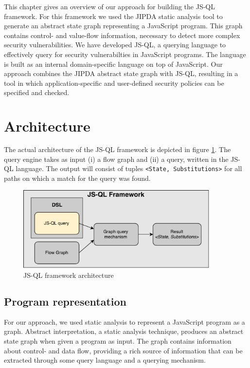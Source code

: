This chapter gives an overview of our approach for building the JS-QL framework. For this framework we used the JIPDA static analysis tool to generate an abstract state graph representing a JavaScript program. This graph contains control- and value-flow information, necessary to detect more complex security vulnerabilities. We have developed JS-QL, a querying language to effectively query for security vulnerabilties in JavaScript programs. The language is built as an internal domain-specific language on top of JavaScript. Our approach combines the JIPDA abstract state graph with JS-QL, resulting in a tool in which application-specific and user-defined security policies can be specified and checked.

\section{Architecture}
\label{sec:Architecture}

The actual architecture of the JS-QL framework is depicted in figure \ref{fig:architecture}. The query engine takes as input (i) a flow graph and (ii) a query, written in the JS-QL language. The output will consist of tuples \texttt{<State, Substitutions>} for all paths on which a match for the query was found.

\begin{figure}
    \centering
      \includegraphics[width=0.9\textwidth]{images/Architecture} 
      \caption{JS-QL framework architecture}
    \label{fig:architecture}
\end{figure}

\subsection*{Program representation}

For our approach, we used static analysis to represent a JavaScript program as a graph. Abstract interpretation, a static analysis technique, produces an abstract state graph when given a program as input. The graph contains information about control- and data flow, providing a rich source of information that can be extracted through some query language and a querying mechanism. 

